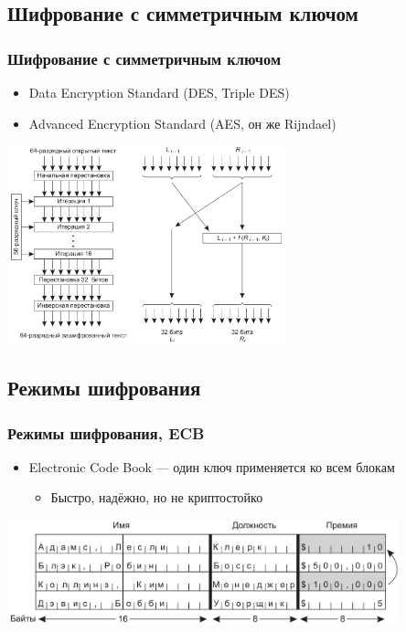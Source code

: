 \documentclass{../../slides-style}
\begin{document}
    \subsection{Шифрование с симметричным ключом}

    \begin{frame}
        \frametitle{Шифрование с симметричным ключом}
        \begin{itemize}
            \item Data Encryption Standard (DES, Triple DES)
            \item Advanced Encryption Standard (AES, он же Rijndael)
        \end{itemize}
        \begin{center}
            \includegraphics[width=0.6\textwidth]{des.png}
        \end{center}
    \end{frame}

    \subsection{Режимы шифрования}

    \begin{frame}
        \frametitle{Режимы шифрования, ECB}
        \begin{itemize}
            \item Electronic Code Book --- один ключ применяется ко всем блокам
            \begin{itemize}
                \item Быстро, надёжно, но не криптостойко
            \end{itemize}
        \end{itemize}
        \begin{center}
            \includegraphics[width=0.85\textwidth]{ecbAttack.png}
        \end{center}
    \end{frame}
\end{document}
